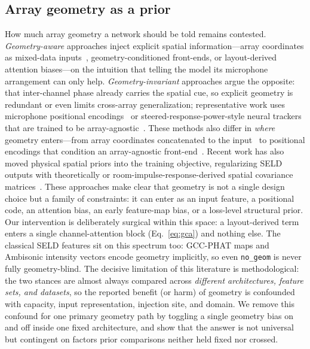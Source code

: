 \subsection{Array geometry as a prior}
How much array geometry a network should be told remains contested.
\emph{Geometry-aware} approaches inject explicit spatial information---array
coordinates as mixed-data inputs~\cite{kowalk2022geometry}, geometry-conditioned
front-ends, or layout-derived attention biases---on the intuition that telling
the model its microphone arrangement can only help. \emph{Geometry-invariant}
approaches argue the opposite: that inter-channel phase already carries the
spatial cue, so explicit geometry is redundant or even limits cross-array
generalization; representative work uses microphone positional
encodings~\cite{baek2025gidoaenet} or steered-response-power-style neural
trackers that are trained to be array-agnostic~\cite{neuralsrp2024}. These
methods also differ in \emph{where} geometry enters---from array coordinates
concatenated to the input~\cite{kowalk2022geometry} to positional encodings that
condition an array-agnostic front-end~\cite{baek2025gidoaenet,neuralsrp2024}.
Recent work has also moved physical spatial priors into the training objective,
regularizing SELD outputs with theoretically or room-impulse-response-derived
spatial covariance matrices~\cite{liu2025physically}. These approaches make
clear that geometry is not a single design choice but a family of constraints:
it can enter as an input feature, a positional code, an attention bias, an early
feature-map bias, or a loss-level structural prior. Our intervention is
deliberately surgical within this space: a layout-derived term enters a single
channel-attention block (Eq.~\eqref{eq:gca}) and nothing else. The classical SELD
features sit on this spectrum too: GCC-PHAT maps and Ambisonic intensity vectors
encode geometry implicitly, so even \texttt{no\_geom} is never fully
geometry-blind. The decisive limitation of this literature is methodological:
the two stances are almost always compared across \emph{different architectures,
feature sets, and datasets}, so the reported benefit (or harm) of geometry is
confounded with capacity, input representation, injection site, and domain. We
remove this confound for one primary geometry path by toggling a single geometry
bias on and off inside one fixed architecture, and show that the answer is not
universal but contingent on factors prior comparisons neither held fixed nor
crossed.

